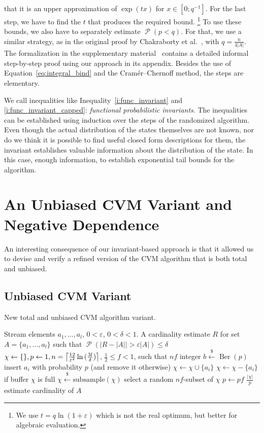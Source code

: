 \documentclass[a4paper,UKenglish,cleveref, autoref, thm-restate]{lipics-v2021}
\newcommand{\getsr}{\xleftarrow{\$}}
\DeclarePairedDelimiter{\ceil}{\lceil}{\rceil}
\DeclareMathOperator{\Ber}{\mathrm{Ber}}
\DeclareMathOperator{\prob}{\mathcal P}
\begin{document}
that it is an upper approximation of $\exp(tx)$ for $x \in [0;q^{-1}]$.
For the last step, we have to find the $t$ that produces the required bound.%
\footnote{We use $t = q \ln(1+\varepsilon)$ which is not the real optimum, but better for algebraic evaluation.}
To use these bounds, we also have to separately estimate $\prob(p < q)$.
For that, we use a similar strategy, as in the original proof by Chakraborty et al.~\cite{chakraborty2023}, with $q = \frac{n}{4 |A|}$.
The formalization in the supplementary material~\cite{CVM_Distinct_Elements-AFP} contains a detailed informal step-by-step proof using our approach in its appendix.
Besides the use of Equation~\ref{eq:integral_bind} and the Cram\'er--Chernoff method, the steps are elementary.

We call inequalities like Inequality~\ref{i:func_invariant} and \ref{i:func_invariant_capped}: \emph{functional probabilistic invariants}.
The inequalities can be established using induction over the steps of the randomized algorithm.
Even though the actual distribution of the states themselves are not known, nor do we think it is possible to find useful closed form descriptions for them, the invariant establishes valuable information about the distribution of the state. In this case, enough information, to establish exponential tail bounds for the algorithm.

\section{An Unbiased CVM Variant and Negative Dependence\label{sec:negdep}}
An interesting consequence of our invariant-based approach is that it allowed us to devise and verify a refined version of the CVM algorithm that is both total and unbiased.

\subsection{Unbiased CVM Variant}
\begin{algorithm}[t!]
	\caption{New total and unbiased CVM algorithm variant.}\label{alg:cvm_new}
	\begin{algorithmic}[1]
  \Require Stream elements $a_1,\dots,a_l$, $0 < \varepsilon$, $0 < \delta < 1$.
  \Ensure A cardinality estimate $R$ for set $A = \{ a_1,\dots,a_l \}$ such that $\prob \left( |R - |A| | > \varepsilon |A| \right) \leq \delta$
  \State $\chi \gets \{\}, p \gets 1, n = \ceil*{\frac{12}{\varepsilon^2} \ln{(\frac{3l}{\delta})} }$, $\frac{1}{2} \leq f < 1$, such that $nf$ integer
    \State $b \getsr \Ber(p)$ \Comment insert $a_i$ with probability $p$ (and remove it otherwise)
      \State $\chi \gets \chi \cup \{a_i\}$
    \Else
      \State $\chi \gets \chi - \{a_i\}$
    \EndIf
     \Comment if buffer $\chi$ is full
      \State $\chi \getsr \mathrm{subsample}(\chi)$ \Comment select a random $nf$-subset of $\chi$
      \State $p \gets pf$
    \EndIf
  \EndFor
  \State \Return $\frac{|\chi|}{p}$ \Comment estimate cardinality of $A$
  \end{algorithmic}
\end{algorithm}%
\end{document}
